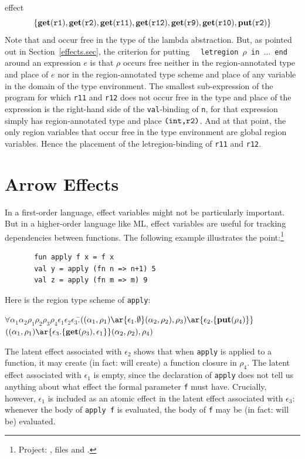 \documentclass[12pt]{book}
\begin{document}
effect
$$\{\mathop{\bf get}\nolimits(\hbox{\tt r1}), \mathop{\bf get}\nolimits(\hbox{\tt r2}), \mathop{\bf get}\nolimits(\hbox{\tt r11}), 
    \mathop{\bf get}\nolimits(\hbox{\tt r12}), \mathop{\bf get}\nolimits(\hbox{\tt r9}),
    \mathop{\bf get}\nolimits(\hbox{\tt r10}), \mathop{\bf put}\nolimits(\hbox{\tt r2})\}$$
Note that  and  occur free in the type of the
lambda abstraction. But, as pointed out in Section~\ref{effects.sec},
the criterion
for putting ~~{\tt letregion $\rho$ in $\ldots$ end}~~ around an expression $e$
is that $\rho$ occurs free neither in the region-annotated type and place of $e$ nor
in the region-annotated type scheme and place of any variable in the domain of the
type environment. The smallest sub-expression
of the program for which {\tt r11} and {\tt r12} does not occur free in
the type and place of the expression is the right-hand side 
of the {\tt val}-binding of {\tt n}, for that expression
simply has region-annotated type and place $\hbox{\tt (int,r2)}$.
And at that point, the only region variables that occur free in
the type environment are global region variables.
Hence the placement of the letregion-binding of {\tt r11} and
{\tt r12}.

\section{Arrow Effects}
In a first-order language, effect variables might not be particularly important.
But in a higher-order language like ML, effect variables are useful for tracking
dependencies between functions. The following example illustrates the point:\footnote{Project: , files
 and .}
\begin{verbatim}
       fun apply f x = f x
       val y = apply (fn n => n+1) 5
       val z = apply (fn m => m) 9
\end{verbatim}
Here is the region type scheme of {\tt apply}:
\begin{tabbing}
\qquad$\forall\alpha_1\alpha_2\rho_1\rho_2\rho_3\rho_4\epsilon_1\epsilon_2\epsilon_3.$\=$((\alpha_1,\rho_1)
        \ar{\epsilon_1.\emptyset}(\alpha_2,\rho_2),\rho_3)\ar{\epsilon_2.\{\Put(\rho_4)\}}$\\
            \>$((\alpha_1,\rho_1)\ar{\epsilon_3.\{\Get(\rho_3), \epsilon_1\}}(\alpha_2,\rho_2),\rho_4)$
\end{tabbing}
The latent effect associated with $\epsilon_2$ shows that when {\tt apply} is applied to a function,
it may create (in fact: will create) a function closure in $\rho_4$.  The latent effect associated with
$\epsilon_1$ is empty, since the declaration of {\tt apply} does not tell us anything about what effect
the formal parameter {\tt f} must have. Crucially,  however, $\epsilon_1$ is included as an atomic effect
in the latent effect associated with $\epsilon_3$: whenever the body of {\tt apply f} is evaluated, the
body of {\tt f} may be (in fact: will be) evaluated.
\end{document}
